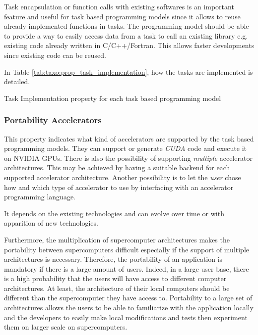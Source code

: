 Task encapsulation or function calls with existing softwares is an important feature and useful for task based programming models since it allows to reuse already implemented functions in tasks.
The programming model should be able to provide a way to easily access data from a task to call an existing library e.g. existing code already written in C/C++/Fortran.
This allows faster developments since existing code can be reused.

In Table \ref{tab:taxo:prop_task_implementation}, how the tasks are implemented is detailed.
\begin{table}[H]
	\caption{Task Implementation property for each task based programming model \label{tab:taxo:prop_task_implementation}}
	\centering
	\begin{multicols}{2}
		

		
	\end{multicols}
\end{table}

\subsubsection{Portability Accelerators}
This property indicates what kind of accelerators are supported by the task based programming models.
They can support or generate \textit{CUDA} code and execute it on NVIDIA GPUs.
There is also the possibility of supporting \textit{multiple} accelerator architectures.
This may be achieved by having a suitable backend for each supported accelerator architecture.
Another possibility is to let the \textit{user} chose how and which type of accelerator to use by interfacing with an accelerator programming language.

It depends on the existing technologies and can evolve over time or with apparition of new technologies.

Furthermore, the multiplication of supercomputer architectures makes the portability between supercomputers difficult especially if the support of multiple architectures is necessary.
Therefore, the portability of an application is mandatory if there is a large amount of users.
Indeed, in a large user base, there is a high probability that the users will have access to different computer architectures.
At least, the architecture of their local computers should be different than the supercomputer they have access to.
Portability to a large set of architectures allows the users to be able to familiarize with the application locally and the developers to easily make local modifications and tests then experiment them on larger scale on supercomputers.

